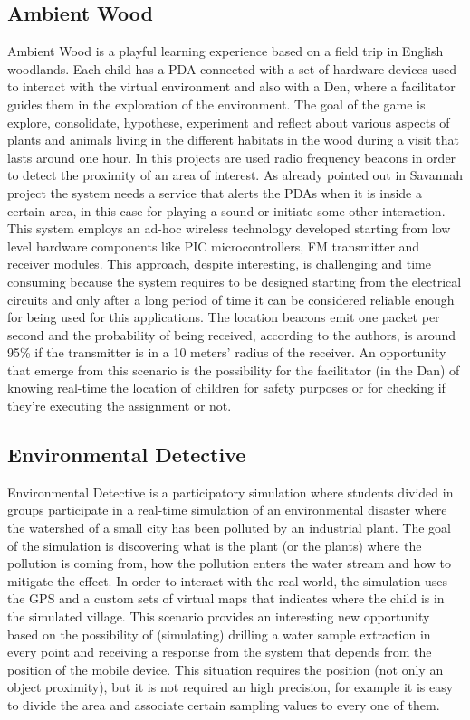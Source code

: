 \subsection{Ambient Wood}
Ambient Wood \cite{randell:ambient_wood} is a playful learning experience based on a field trip in English woodlands. Each child has a PDA connected with a set of hardware devices used to interact with the virtual environment and also with a Den, where a facilitator guides them in the exploration of the environment. The goal of the game is explore, consolidate, hypothese, experiment and reflect about various aspects of plants and animals living in the different habitats in the wood during a visit that lasts around one hour. In this projects are used radio frequency beacons in order to detect the proximity of an area of interest. As already pointed out in Savannah project the system needs a service that alerts the PDAs when it is inside a certain area, in this case for playing a sound or initiate some other interaction. This system employs an ad-hoc wireless technology developed starting from low level hardware components like PIC microcontrollers, FM transmitter and receiver modules. This approach, despite interesting, is challenging and time consuming because the system requires to be designed starting from the electrical circuits and only after a long period of time it can be considered reliable enough for being used for this applications. The location beacons emit one packet per second and the probability of being received, according to the authors, is around 95\% if the transmitter is in a 10 meters’ radius of the receiver. An opportunity that emerge from this scenario is the possibility for the facilitator (in the Dan) of knowing real-time the location of children for safety purposes or for checking if they're executing the assignment or not.

\subsection{Environmental Detective}
Environmental Detective \cite{klopfer:environmental_detectives} is a participatory simulation where students divided in groups participate in a real-time simulation of an environmental disaster where the watershed of a small city has been polluted by an industrial plant. The goal of the simulation is discovering what is the plant (or the plants) where the pollution is coming from, how the pollution enters the water stream and how to mitigate the effect. In order to interact with the real world, the simulation uses the GPS and a custom sets of virtual maps that indicates where the child is in the simulated village. This scenario provides an interesting new opportunity based on the possibility of (simulating) drilling a water sample extraction in every point and receiving a response from the system that depends from the position of the mobile device. This situation requires the position (not only an object proximity), but it is not required an high precision, for example it is easy to divide the area and associate certain sampling values to every one of them.


